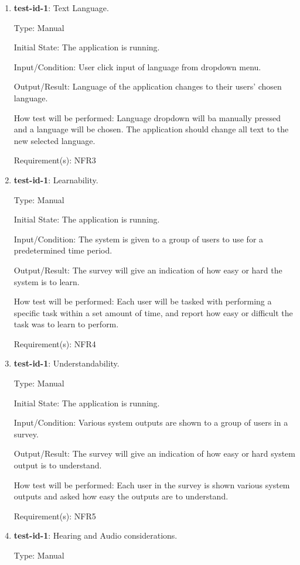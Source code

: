 \documentclass[12pt, titlepage]{article}
\begin{document}
\begin{enumerate}
		\item{\textbf{test-id-1}}: Text Language.
		
		Type: Manual
		
		Initial State: The application is running.
		
		Input/Condition: User click input of language from dropdown menu.

		Output/Result: Language of the application changes to their users' chosen language.
		
		How test will be performed: Language dropdown will ba manually pressed and a language will be chosen. The application should change all text to the new selected language.
		
		Requirement(s): NFR3
		
		\item{\textbf{test-id-1}}: Learnability.
		
		Type: Manual
		
		Initial State: The application is running.
		
		Input/Condition: The system is given to a group of users to use for a predetermined time period.
		
		Output/Result: The survey will give an indication of how easy or hard the system is to learn.
		
		How test will be performed: Each user will be tasked with performing a specific task within a set amount of time, and report how easy or difficult the task was to learn to perform.
		
		Requirement(s): NFR4
		
		\item{\textbf{test-id-1}}: Understandability.
		
		Type: Manual

		Initial State: The application is running.
		
		Input/Condition: Various system outputs are shown to a group of users in a survey.
		
		Output/Result: The survey will give an indication of how easy or hard system output is to understand.
		
		How test will be performed: Each user in the survey is shown various system outputs and asked how easy the outputs are to understand.
		
		Requirement(s): NFR5
		
		\item{\textbf{test-id-1}}: Hearing and Audio considerations.
		
		Type: Manual
		

\end{enumerate}
\end{document}
